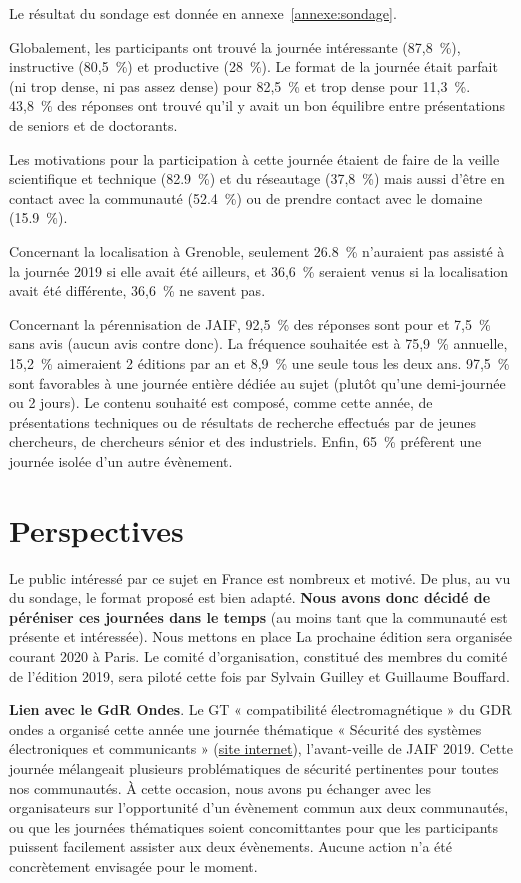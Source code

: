\documentclass[a4paper,11pt]{article}
\begin{document}
Le résultat du sondage est donnée en annexe \ref{annexe:sondage}.

Globalement, les participants ont trouvé la journée intéressante (87,8 \%), instructive (80,5 \%) et productive (28 \%). Le format de la journée était parfait (ni trop dense, ni pas assez dense) pour 82,5 \% et trop dense pour 11,3 \%. 43,8 \% des réponses ont trouvé  qu'il y avait un bon équilibre entre présentations de seniors et de doctorants.

Les motivations pour la participation à cette journée étaient de faire de la veille scientifique et technique (82.9 \%) et du réseautage (37,8 \%) mais aussi d'être en contact avec la communauté (52.4 \%) ou de prendre contact avec le domaine (15.9 \%).

Concernant la localisation à Grenoble, seulement 26.8 \% n'auraient pas assisté à la journée 2019 si elle avait été ailleurs, et 36,6 \% seraient venus si la localisation avait été différente, 36,6 \% ne savent pas.

Concernant la pérennisation de JAIF, 92,5 \% des réponses sont pour et 7,5 \% sans avis (aucun avis contre donc). La fréquence souhaitée est à 75,9 \% annuelle, 15,2 \% aimeraient 2 éditions par an et 8,9 \% une seule tous les deux ans. 97,5 \% sont favorables à une journée entière dédiée au sujet (plutôt qu'une demi-journée ou 2 jours). Le contenu souhaité est composé, comme cette année, de présentations techniques ou de résultats de recherche effectués par de jeunes chercheurs, de chercheurs sénior et des industriels.
Enfin, 65 \% préfèrent une journée isolée d'un autre évènement.

\section{Perspectives}
\label{sec:org06aa6a7}

Le public intéressé par ce sujet en France est nombreux et motivé. De
plus, au vu du sondage, le format proposé est bien adapté. \textbf{Nous avons
donc décidé de péréniser ces journées dans le temps} (au moins tant
que la communauté est présente et intéressée).  Nous mettons en place
La prochaine édition sera organisée courant 2020 à Paris.  Le comité
d'organisation, constitué des membres du comité de l'édition 2019,
sera piloté cette fois par Sylvain Guilley et Guillaume Bouffard.

\textbf{Lien avec le GdR Ondes}.  Le GT « compatibilité électromagnétique »
du GDR ondes a organisé cette année une journée thématique « Sécurité
des systèmes électroniques et communicants » (\href{http://gdr-ondes.cnrs.fr/2019/02/14/journee-thematique-securite-des-systemes-electroniques-et-communicants-21-mai-2019-paris-jussieu}{site internet}),
l'avant-veille de JAIF 2019.  Cette journée mélangeait plusieurs
problématiques de sécurité pertinentes pour toutes nos communautés.  À
cette occasion, nous avons pu échanger avec les organisateurs sur
l'opportunité d'un évènement commun aux deux communautés, ou que les
journées thématiques soient concomittantes pour que les participants
puissent facilement assister aux deux évènements.  Aucune action n'a
été concrètement envisagée pour le moment.
\end{document}
